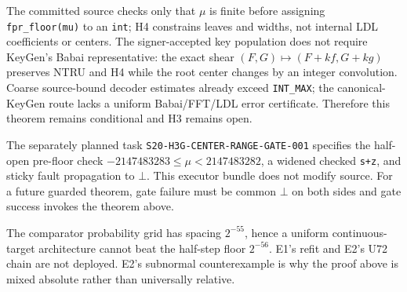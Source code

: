 \begin{remark}
The committed source checks only that $\mu$ is finite before assigning
\texttt{fpr\_floor(mu)} to an \texttt{int}; H4 constrains leaves and widths,
not internal LDL coefficients or centers.  The signer-accepted key population
does not require KeyGen's Babai representative: the exact shear
$(F,G)\mapsto(F+kf,G+kg)$ preserves NTRU and H4 while the root center changes
by an integer convolution.  Coarse source-bound decoder estimates already
exceed \texttt{INT\_MAX}; the canonical-KeyGen route lacks a uniform
Babai/FFT/LDL error certificate.  Therefore this theorem remains conditional
and H3 remains open.
\end{remark}

\begin{remark}
The separately planned task \texttt{S20-H3G-CENTER-RANGE-GATE-001} specifies
the half-open pre-floor check
$-2147483283\le\mu<2147483282$, a widened checked \texttt{s+z}, and sticky
fault propagation to $\bot$.  This executor bundle does not modify source.
For a future guarded theorem, gate failure must be common $\bot$ on both
sides and gate success invokes the theorem above.
\end{remark}

\begin{remark}
The comparator probability grid has spacing $2^{-55}$, hence a uniform
continuous-target architecture cannot beat the half-step floor $2^{-56}$.
E1's refit and E2's U72 chain are not deployed.  E2's subnormal counterexample
is why the proof above is mixed absolute rather than universally relative.
\end{remark}
